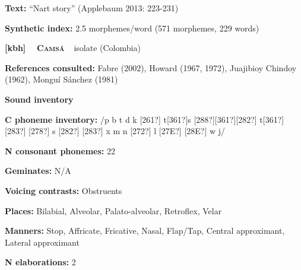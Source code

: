 \begin{styleBody}
\textbf{Text:} “Nart story” (Applebaum 2013: 223-231)
\end{styleBody}

\begin{styleBody}
\textbf{Synthetic index: }2.5 morphemes/word (571 morphemes, 229 words)
\end{styleBody}

\clearpage\begin{styleBody}
\textbf{[kbh] }\ \ \textbf{\textsc{Camsá}}\textbf{\ \ }isolate (Colombia)
\end{styleBody}

\begin{styleBody}
\textbf{References consulted: }Fabre (2002), Howard (1967, 1972), Juajibioy Chindoy (1962), Monguí Sánchez (1981)
\end{styleBody}

\begin{styleBody}
\textbf{Sound inventory}
\end{styleBody}

\begin{styleBody}
\textbf{C phoneme inventory:} /p b t d k [261?] t[361?]s [288?][361?][282?] t[361?][283?] [278?] s [282?] [283?] x m n [272?] l [27E?] [28E?] w j/
\end{styleBody}

\begin{styleBody}
\textbf{N consonant phonemes:} 22
\end{styleBody}

\begin{styleBody}
\textbf{Geminates:} N/A
\end{styleBody}

\begin{styleBody}
\textbf{Voicing contrasts:} Obstruents
\end{styleBody}

\begin{styleBody}
\textbf{Places:} Bilabial, Alveolar, Palato-alveolar, Retroflex, Velar
\end{styleBody}

\begin{styleBody}
\textbf{Manners:} Stop, Affricate, Fricative, Nasal, Flap/Tap, Central approximant, Lateral approximant
\end{styleBody}

\begin{styleBody}
\textbf{N elaborations:} 2
\end{styleBody}

